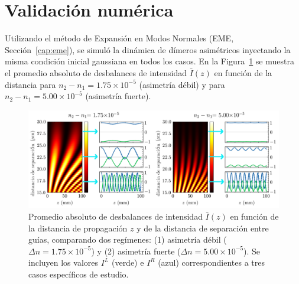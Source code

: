 \section{Validación numérica}

Utilizando el método de Expansión en Modos Normales (EME, Sección~\ref{cap:eme}), se simuló la dinámica de dímeros asimétricos inyectando la misma condición inicial gaussiana en todos los casos. En la Figura~\ref{fig:nonotrho-num} se muestra el promedio absoluto de desbalances de intensidad $\bar{I}(z)$ en función de la distancia para $n_2 - n_1 = 1.75 \times 10^{-5}$ (asimetría débil) y para $n_2 - n_1 = 5.00 \times 10^{-5}$ (asimetría fuerte).

\begin{figure}[H]
	\centering
	\includegraphics[width=\linewidth]{media/imbalance-nonortho.png}
	\caption[Promedio absoluto de desbalances de intensidad $\bar{I}(z)$ en función de la distancia de propagación $z$]{Promedio absoluto de desbalances de intensidad $\bar{I}(z)$ en función de la distancia de propagación $z$ y de la distancia de separación entre guías, comparando dos regímenes: (1) asimetría débil ($\Delta n = 1.75 \times 10^{-5}$) y (2) asimetría fuerte ($\Delta n = 5.00 \times 10^{-5}$). Se incluyen los valores $I^L$ (verde) e $I^R$ (azul) correspondientes a tres casos específicos de estudio.}
	\label{fig:nonotrho-num}
\end{figure}
